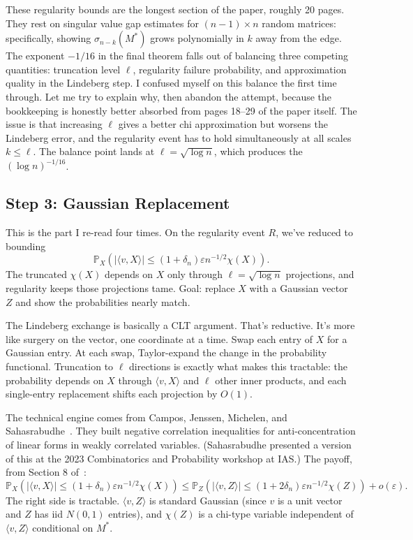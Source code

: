 \documentclass[11pt]{article}
\theoremstyle{definition}
\theoremstyle{remark}
\newcommand{\Prob}{\mathbb{P}}
\begin{document}
These regularity bounds are the longest section of the paper, roughly 20 pages.
They rest on singular value gap estimates for $(n-1) \times n$ random matrices: specifically, showing $\sigma_{n-k}(M^*)$ grows polynomially in $k$ away from the edge.
The exponent $-1/16$ in the final theorem falls out of balancing three competing quantities: truncation level $\ell$, regularity failure probability, and approximation quality in the Lindeberg step.
I confused myself on this balance the first time through. Let me try to explain why, then abandon the attempt, because the bookkeeping is honestly better absorbed from pages 18--29 of the paper itself.
The issue is that increasing $\ell$ gives a better chi approximation but worsens the Lindeberg error, and the regularity event has to hold simultaneously at all scales $k \le \ell$. The balance point lands at $\ell = \sqrt{\log n}$, which produces the $(\log n)^{-1/16}$.

\subsection{Step 3: Gaussian Replacement}
\label{sec:gaussian-replacement}

This is the part I re-read four times.
On the regularity event $R$, we've reduced to bounding
\[
  \Prob_X\!\left(|\langle v, X \rangle| \le (1 + \delta_n)\varepsilon n^{-1/2} \chi(X)\right).
\]
The truncated $\chi(X)$ depends on $X$ only through $\ell = \sqrt{\log n}$ projections, and regularity keeps those projections tame. Goal: replace $X$ with a Gaussian vector $Z$ and show the probabilities nearly match.

The Lindeberg exchange is basically a CLT argument. That's reductive. It's more like surgery on the vector, one coordinate at a time.
Swap each entry of $X$ for a Gaussian entry.
At each swap, Taylor-expand the change in the probability functional. Truncation to $\ell$ directions is exactly what makes this tractable: the probability depends on $X$ through $\langle v, X\rangle$ and $\ell$ other inner products, and each single-entry replacement shifts each projection by $O(1)$.

The technical engine comes from Campos, Jenssen, Michelen, and Sahasrabudhe~\cite{campos2023negative}. They built negative correlation inequalities for anti-concentration of linear forms in weakly correlated variables. (Sahasrabudhe presented a version of this at the 2023 Combinatorics and Probability workshop at IAS.)
The payoff, from Section 8 of~\cite{sah2024spielman}:
\begin{equation}
  \label{eq:lindeberg}
  \Prob_X\!\left(|\langle v, X \rangle| \le (1 + \delta_n)\varepsilon n^{-1/2} \chi(X)\right)
  \le \Prob_Z\!\left(|\langle v, Z \rangle| \le (1 + 2\delta_n)\varepsilon n^{-1/2} \chi(Z)\right)
  + o(\varepsilon).
\end{equation}
The right side is tractable. $\langle v, Z \rangle$ is standard Gaussian (since $v$ is a unit vector and $Z$ has iid $N(0,1)$ entries), and $\chi(Z)$ is a chi-type variable independent of $\langle v, Z \rangle$ conditional on $M^*$.
\end{document}
